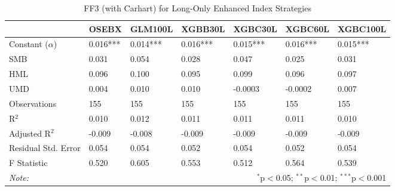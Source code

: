 \begin{table}[H] 
\centering 
  \caption{FF3 (with Carhart) for Long-Only Enhanced Index Strategies} 
  \vspace{1em}
  \label{table:enhanced-ff3-selected-long-only} 
\begin{tabularx}{\textwidth}{lXXXXXX} 
\toprule
 & OSEBX & GLM100L & XGBB30L & XGBC30L & XGBC60L & XGBC100L \\ 
\midrule
Constant ($\alpha$) & \cellcolor{lightlightgreen}0.016*** & 0.014*** & \cellcolor{lightlightgreen}0.016*** & 0.015*** & \cellcolor{lightlightgreen}0.016*** & 0.015*** \\ 
SMB & 0.031 & 0.054 & 0.028 & 0.047 & 0.025 & 0.031 \\ 
HML & 0.096 & 0.100 & 0.095 & 0.099 & 0.096 & 0.097 \\ 
UMD & 0.004 & 0.010 & 0.010 & -0.0003 & -0.0002 & 0.007 \\ 
\midrule 
Observations & 155 & 155 & 155 & 155 & 155 & 155 \\ 
R$^{2}$ & 0.010 & 0.012 & 0.011 & 0.011 & 0.011 & 0.010 \\ 
Adjusted R$^{2}$ & -0.009 & -0.008 & -0.009 & -0.009 & -0.009 & -0.009 \\ 
Residual Std. Error & 0.054 & 0.054 & 0.052 & 0.054 & 0.052 & 0.054 \\ 
F Statistic & 0.520 & 0.605 & 0.553 & 0.512 & 0.564 & 0.539 \\ 
\bottomrule
\textit{Note:} & \multicolumn{6}{r}{$^{*}$p$<$0.05; $^{**}$p$<$0.01; $^{***}$p$<$0.001} \\ 
\end{tabularx} 
\end{table}



